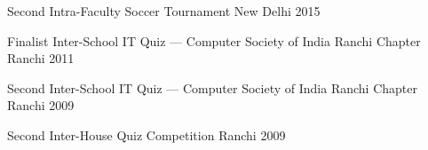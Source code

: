 

\begin{cvhonours}

\cvhonour%
  {Second} %
  {Intra-Faculty Soccer Tournament} %
  {New Delhi} %
  {2015} %

\end{cvhonours}


\begin{cvhonours}

\cvhonour%
  {Finalist} %
  {Inter-School IT Quiz --- Computer Society of India Ranchi Chapter} %
  {Ranchi} %
  {2011} %

\cvhonour%
  {Second} %
  {Inter-School IT Quiz --- Computer Society of India Ranchi Chapter} %
  {Ranchi} %
  {2009} %

\cvhonour%
  {Second} %
  {Inter-House Quiz Competition} %
  {Ranchi} %
  {2009} %

\end{cvhonours}
